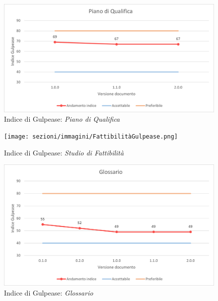 \begin{figure}[!ht]
    \caption{Indice di Gulpease: \textit{Piano di Qualifica}}
    \vspace{10px}
    \includegraphics[scale=0.5]{sezioni/immagini/PianoQualificaGulpease.png}
    \centering
\end{figure}
\pagebreak
\begin{figure}[!ht]
    \caption{Indice di Gulpease: \textit{Studio di Fattibilità}}
    \vspace{10px}
    \texttt{[image: sezioni/immagini/FattibilitàGulpease.png]}
    \centering
\end{figure}

\begin{figure}[!ht]
    \caption{Indice di Gulpease: \textit{Glossario}}
    \vspace{10px}
    \includegraphics[scale=0.5]{sezioni/immagini/GlossarioGulpease.png}
    \centering
\end{figure}

